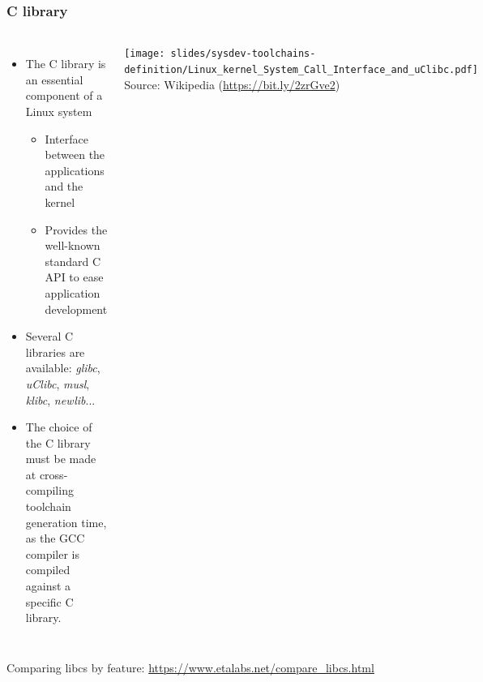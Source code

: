 \begin{frame}
  \frametitle{C library}
  \begin{columns}
    \begin{itemize}
    \item The C library is an essential component of a Linux system
      \begin{itemize}
      \item Interface between the applications and the kernel
      \item Provides the well-known standard C API to ease application
        development
      \end{itemize}
    \item Several C libraries are available:
      {\em glibc}, {\em uClibc}, {\em musl}, {\em klibc}, {\em
        newlib}...
    \item The choice of the C library must be made at
      cross-compiling toolchain generation time, as the GCC compiler is
      compiled against a specific C library.
    \end{itemize}
    \texttt{[image: slides/sysdev-toolchains-definition/Linux\_kernel\_System\_Call\_Interface\_and\_uClibc.pdf]}\\
    {\tiny Source: Wikipedia (\url{https://bit.ly/2zrGve2})}
  \end{columns}
  Comparing libcs by feature: \url{https://www.etalabs.net/compare_libcs.html}
\end{frame}
